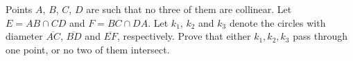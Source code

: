Points $A$, $B$, $C$, $D$ are such that no three of them are collinear. Let $E=AB\cap CD$ and $F=BC\cap DA$. Let $k_1$, $k_2$ and $k_3$ denote the circles with diameter $\overline{AC}$, $\overline{BD}$ and $\overline{EF}$, respectively. Prove that either $k_1,k_2,k_3$ pass through one point, or no two of them intersect.